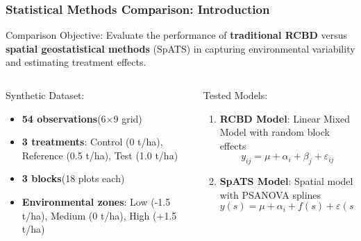 \documentclass[aspectratio=43]{beamer}
\begin{document}
\begin{frame}
    \frametitle{\small Statistical Methods Comparison: Introduction}
    
    \begin{block}{Comparison Objective:}
        Evaluate the performance of \textbf{traditional RCBD} versus \textbf{spatial geostatistical methods} (SpATS) in capturing environmental variability and estimating treatment effects.
    \end{block}
    
    \begin{columns}
        \begin{column}{0.5\textwidth}
            \begin{exampleblock}{Synthetic Dataset:}
                \begin{itemize}
                    \item \textbf{\small 54 observations}\small (6\ensuremath{\times}9 grid)
                    \item \textbf{\small 3 treatments}\small : Control (0 t/ha), Reference (0.5 t/ha), Test (1.0 t/ha)
                    \item \textbf{\small 3 blocks}\small (18 plots each)
                    \item \textbf{\small Environmental zones}\small : Low (-1.5 t/ha), Medium (0 t/ha), High (+1.5 t/ha)
                \end{itemize}
            \end{exampleblock}
        \end{column}
        
        \begin{column}{0.5\textwidth}
            \begin{alertblock}{Tested Models:}
                \begin{enumerate}
                    \item \textbf{RCBD Model}: Linear Mixed Model with random block effects
                    \begin{equation*}
                        y_{ij} = \mu + \alpha_i + \beta_j + \varepsilon_{ij}
                    \end{equation*}
                    
                    \item \textbf{SpATS Model}: Spatial model with PSANOVA splines
                    \begin{equation*}
                        y(s) = \mu + \alpha_i + f(s) + \varepsilon(s)
                    \end{equation*}
                \end{enumerate}
            \end{alertblock}
        \end{column}
    \end{columns}
    

\end{frame}
\end{document}
